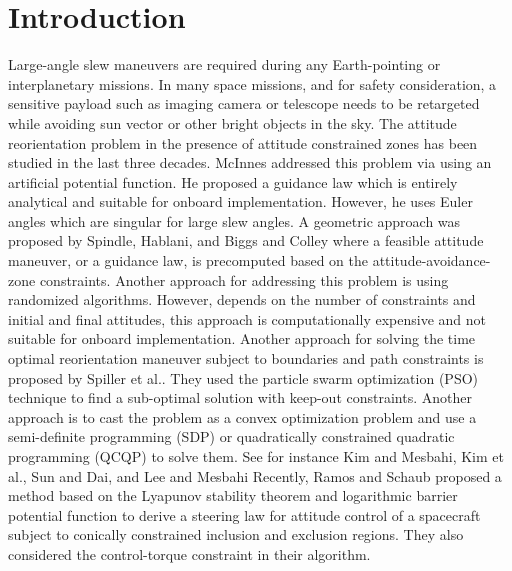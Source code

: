 \documentclass[letterpaper, preprint, paper,11pt]{AAS}	%
\begin{document}
	\section{Introduction}
	Large-angle slew maneuvers are required during any Earth-pointing or interplanetary missions. In many space missions, and for safety consideration, a sensitive payload such as imaging camera or telescope needs to be retargeted while avoiding sun vector or other bright objects in the sky.
	The attitude reorientation problem in the presence of attitude constrained zones has been studied in the last three decades. McInnes\cite{McInnes1994} addressed this problem via using an artificial potential function. He proposed a guidance law which is entirely analytical and suitable for onboard implementation. However, he uses Euler angles which are singular for large slew angles. 
	A geometric approach was proposed by Spindle\cite{Spindler1998}, Hablani\cite{Hablani1998}, and Biggs and Colley\cite{Biggs2016}  where a feasible attitude maneuver, or a guidance law, is precomputed based on the attitude-avoidance-zone constraints.  Another approach for addressing this problem is using randomized algorithms\cite{Frazzoli01}. However, depends on the number of constraints and initial and final attitudes, this approach is computationally expensive and not suitable for onboard implementation. Another approach for solving the time optimal reorientation maneuver subject to boundaries and path constraints is proposed by Spiller et al.\cite{Spiller2016}. They used the particle swarm optimization (PSO) technique to find a sub-optimal solution with keep-out constraints. Another approach is to cast the problem as a convex optimization problem and use a semi-definite programming (SDP) or  quadratically constrained quadratic programming (QCQP) to solve them.  See for instance Kim and Mesbahi\cite{Kim2004}, Kim et al.\cite{Kim2010}, Sun and Dai\cite{Sun2015}, and Lee and Mesbahi\cite{Lee2014} %
	Recently, Ramos and Schaub\cite{Ramos2018} proposed a method based on the Lyapunov stability theorem and logarithmic barrier potential function to derive a steering law for attitude control of a spacecraft subject to conically constrained inclusion and exclusion regions. They also considered the control-torque constraint in their algorithm.  
\end{document}
